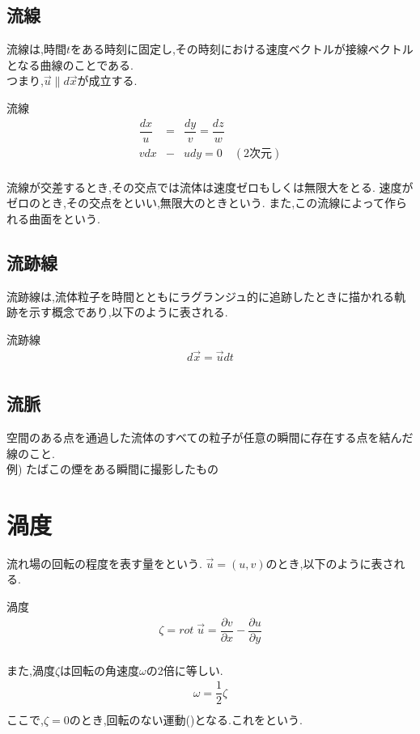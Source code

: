 \documentclass[a4paper]{jsarticle}
\begin{document}
\subsection{流線}
流線は,時間$t$をある時刻に固定し,その時刻における速度ベクトルが接線ベクトルとなる曲線のことである.\\
つまり,$\vec{u}\parallel d\vec{x}$が成立する.
\begin{itembox}[l]{流線}
    \begin{eqnarray*}
        \dfrac{dx}{u}&=&\dfrac{dy}{v}=\dfrac{dz}{w}\\
        vdx&-&udy=0\quad (2次元)\\
    \end{eqnarray*}
\end{itembox}
流線が交差するとき,その交点では流体は速度ゼロもしくは無限大をとる.
速度がゼロのとき,その交点をといい,無限大のときという.
また,この流線によって作られる曲面をという.
\subsection{流跡線}
流跡線は,流体粒子を時間とともにラグランジュ的に追跡したときに描かれる軌跡を示す概念であり,以下のように表される.
\begin{itembox}[l]{流跡線}
    \begin{eqnarray*}
        d\vec{x}=\vec{u}dt\\
    \end{eqnarray*}
\end{itembox}
\subsection{流脈}
空間のある点を通過した流体のすべての粒子が任意の瞬間に存在する点を結んだ線のこと.\\
例) たばこの煙をある瞬間に撮影したもの
\section{渦度}
流れ場の回転の程度を表す量をという.
$\vec{u}=\left(u,v\right)$のとき,以下のように表される.
\begin{itembox}[l]{渦度}
    \begin{eqnarray*}
        \zeta = rot\;\vec{u}=\dfrac{\partial v}{\partial x}-\dfrac{\partial u}{\partial y}\\
    \end{eqnarray*}
\end{itembox}
また,渦度$\zeta$は回転の角速度$\omega$の2倍に等しい.
\begin{eqnarray*}
    \omega = \dfrac{1}{2}\zeta\\
\end{eqnarray*}
ここで,$\zeta=0$のとき,回転のない運動()となる.これをという.
\end{document}
